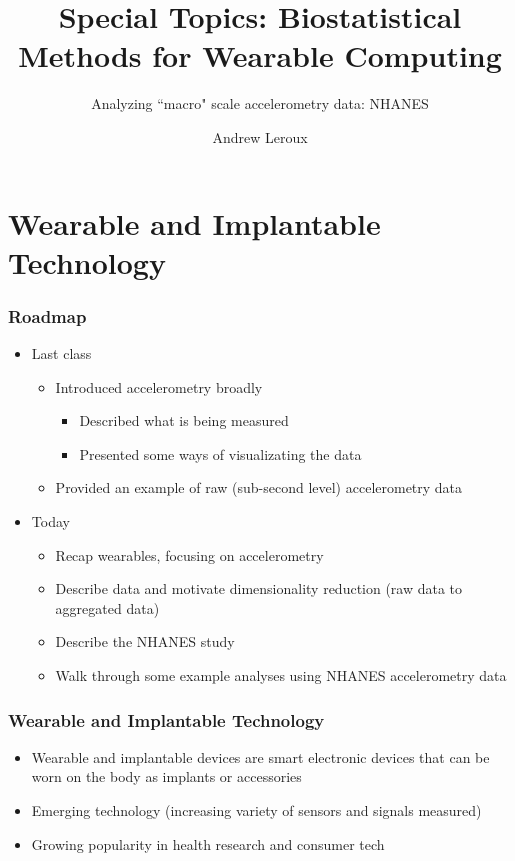 \documentclass[10pt]{beamer}\usepackage[]{graphicx}\usepackage[]{color}
\newcommand\makebeamertitle{\frame{\maketitle}}%
\begin{document}
\title[]{Special Topics: Biostatistical Methods for Wearable Computing}
\subtitle[]{Analyzing ``macro" scale accelerometry data: NHANES}
\author[]{Andrew Leroux}
\makebeamertitle






\section{Wearable and Implantable Technology}

\begin{frame}
\frametitle{Roadmap}
\begin{itemize}
\item Last class
    \begin{itemize}
    \item Introduced accelerometry broadly
        \begin{itemize}
        \item Described what is being measured
        \item Presented some ways of visualizating the data
        \end{itemize}
    \item Provided an example of raw (sub-second level) accelerometry data
    \end{itemize}
\item Today
    \begin{itemize}
    \item Recap wearables, focusing on accelerometry
    \item Describe data and motivate dimensionality reduction (raw data to aggregated data)
    \item Describe the NHANES study
    \item Walk through some example analyses using NHANES accelerometry data
    \end{itemize}
\end{itemize}
\end{frame}



\begin{frame}
\frametitle{Wearable and Implantable Technology}
\begin{itemize}
\item Wearable and implantable devices are smart electronic devices that can be worn on the body as implants or accessories
\item Emerging technology (increasing variety of sensors and signals measured)
\item Growing popularity in health research and consumer tech
\end{itemize}
\end{frame}
\end{document}
